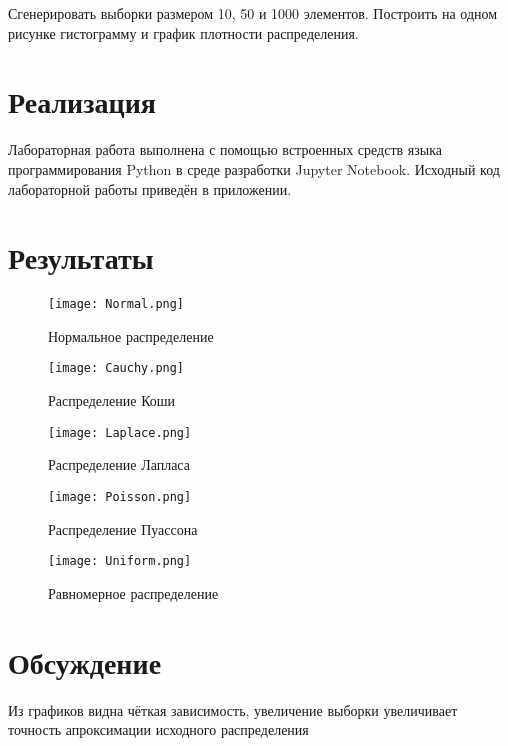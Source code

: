 \documentclass[12pt,a4paper]{scrartcl}
\begin{document}
Сгенерировать выборки размером 10, 50 и 1000 элементов.
Построить на одном рисунке гистограмму и график плотности распределения.

\section {Реализация}
Лабораторная работа выполнена с помощью встроенных средств языка программирования Python в среде разработки Jupyter Notebook. Исходный код лабораторной
работы приведён в приложении.
 
\section{Результаты}
\begin{figure}[h]
  \centering
  \texttt{[image: Normal.png]}
  \caption{Нормальное распределение}
\end{figure}
\begin{figure}
  \centering
  \texttt{[image: Cauchy.png]}
  \caption{Распределение Коши}
\end{figure}
\begin{figure}
\centering
  \texttt{[image: Laplace.png]}
  \caption{Распределение Лапласа}
\end{figure}
\begin{figure}
  \centering
  \texttt{[image: Poisson.png]}
  \caption{Распределение Пуассона}
\end{figure}
\begin{figure}
  \centering
  \texttt{[image: Uniform.png]}
  \caption{Равномерное распределение}
\end{figure}

\section{Обсуждение}
Из графиков видна чёткая зависимость, увеличение выборки увеличивает точность апроксимации исходного распределения
\end{document}
